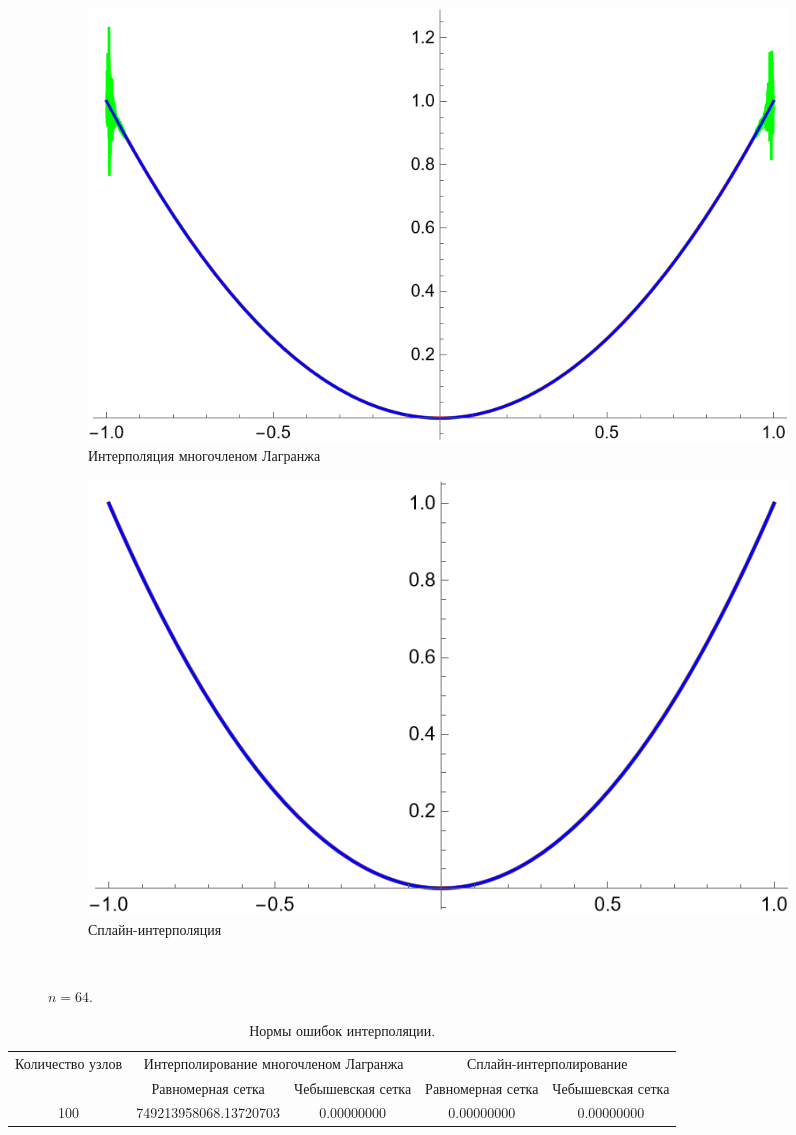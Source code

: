 \documentclass[12pt, a4paper]{article}
\begin{document}
	\begin{figure}[H]
		\centering
		\begin{subfigure}{0.4\textwidth}
			\includegraphics[width=\textwidth]{1_l64}
			\caption{Интерполяция многочленом Лагранжа}
		\end{subfigure}
		\hfill
		\begin{subfigure}{0.4\textwidth}
			\includegraphics[width=\textwidth]{1_s64}
			\caption{Сплайн-интерполяция}
		\end{subfigure}
		\hfill
		\\[0.5cm]
		\caption{$n = 64$.}
	\end{figure}
	
	
	\begin{table}[H]
		\caption{Нормы ошибок интерполяции.}
		\centering
		\footnotesize
		\begin{tabular}{|c|c|c|c|c|}
			\hline
			\multirow{2}{5em}{Количество узлов} & \multicolumn{2}{|c|}{Интерполирование многочленом Лагранжа}&\multicolumn{2}{|c|}{Сплайн-интерполирование}\\
			\cline{2-5}
			&Равномерная сетка &Чебышевская сетка &Равномерная сетка&Чебышевская сетка\\
			\hline
			100& 749213958068.13720703&0.00000000&0.00000000&0.00000000\\
			\hline
		\end{tabular}
	\end{table}
	
\end{document}
